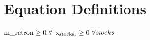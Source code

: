 \documentclass[11pt]{article}
\begin{document}
\section*{Equation Definitions}

\bigskip
\begin{math}\text{m\_retcon}\geq 0 ~ \forall \\\end{math}
\begin{math}\text{x}_{\text{stocks}_{*}}\geq 0 ~ \forall stocks\\\end{math}
\end{document}
